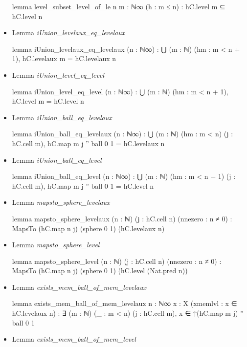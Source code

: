 \documentclass[colorinlistoftodos]{article}
\begin{document}
\begin{itemize}
\begin{leancode}
lemma level_subset_level_of_le {n m : ℕ∞} (h : m ≤ n) : hC.level m ⊆ hC.level n
\end{leancode}
  \item Lemma \emph{iUnion\_levelaux\_eq\_levelaux}
\begin{leancode}
lemma iUnion_levelaux_eq_levelaux (n : ℕ∞) : 
  ⋃ (m : ℕ) (hm : m < n + 1), hC.levelaux m = hC.levelaux n
\end{leancode}
  \item Lemma \emph{iUnion\_level\_eq\_level}
\begin{leancode}
lemma iUnion_level_eq_level (n : ℕ∞) : ⋃ (m : ℕ) (hm : m < n + 1), hC.level m = hC.level n
\end{leancode}
  \item Lemma \emph{iUnion\_ball\_eq\_levelaux}
\begin{leancode}
lemma iUnion_ball_eq_levelaux (n : ℕ∞) :
  ⋃ (m : ℕ) (hm : m < n) (j : hC.cell m), hC.map m j '' ball 0 1 = hC.levelaux n
\end{leancode}
  \item Lemma \emph{iUnion\_ball\_eq\_level}
\begin{leancode}
lemma iUnion_ball_eq_level (n : ℕ∞) :
  ⋃ (m : ℕ) (hm : m < n + 1) (j : hC.cell m), hC.map m j '' ball 0 1 = hC.level n
\end{leancode}
  \item Lemma \emph{mapsto\_sphere\_levelaux}
\begin{leancode}
lemma mapsto_sphere_levelaux (n : ℕ) (j : hC.cell n) (nnezero : n ≠ 0) : 
  MapsTo (hC.map n j) (sphere 0 1) (hC.levelaux  n)
\end{leancode}
  \item Lemma \emph{mapsto\_sphere\_level}
\begin{leancode}
lemma mapsto_sphere_level (n : ℕ) (j : hC.cell n) (nnezero : n ≠ 0) : 
  MapsTo (hC.map n j) (sphere 0 1) (hC.level (Nat.pred n))
\end{leancode}
  \item Lemma \emph{exists\_mem\_ball\_of\_mem\_levelaux}
\begin{leancode}
lemma exists_mem_ball_of_mem_levelaux {n : ℕ∞} {x : X} (xmemlvl : x ∈ hC.levelaux n) : 
  ∃ (m : ℕ) (_ : m < n) (j : hC.cell m), x ∈ ↑(hC.map m j) '' ball 0 1
\end{leancode}
  \item Lemma \emph{exists\_mem\_ball\_of\_mem\_level}
\begin{leancode}

\end{leancode}
\end{itemize}
\end{document}
